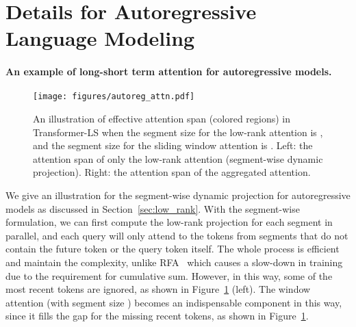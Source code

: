 \section{Details for Autoregressive Language Modeling}
\label{appendix:lm_params}
\paragraph{An example of long-short term attention for autoregressive models.}
\begin{figure}
\begin{center}
    \texttt{[image: figures/autoreg\_attn.pdf]}
\end{center}
\caption{An illustration of effective attention span (colored regions) in Transformer-LS when the segment size for the low-rank attention is , and the segment size for the sliding window attention is . Left: the attention span of only the low-rank attention (segment-wise dynamic projection). Right: the attention span of the aggregated attention. }
\label{fig:autoreg_seg}
\end{figure}
We give an illustration for the segment-wise dynamic projection for autoregressive models as discussed in Section~\ref{sec:low_rank}. With the segment-wise formulation, we can first compute the low-rank projection for each segment in parallel, and each query will only attend to the tokens from segments that do not contain the future token or the query token itself. The whole process is efficient and maintain the  complexity, unlike RFA~\citep{peng2021random} which causes a slow-down in training due to the requirement for cumulative sum. However, in this way, some of the most recent tokens are ignored, as shown in Figure~\ref{fig:autoreg_seg} (left). The window attention (with segment size ) becomes an indispensable component in this way, since it fills the gap for the missing recent tokens, as shown in Figure~\ref{fig:autoreg_seg}.

